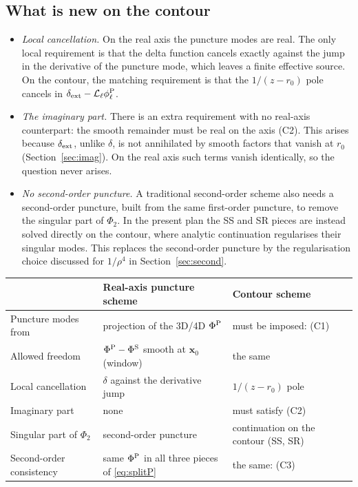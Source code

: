 \documentclass[11pt,a4paper]{article}
\newcommand{\dext}{\delta_{\rm ext}}
\newcommand{\Lop}{\mathcal{L}_\ell}
\newcommand{\PhiS}{\Phi^{\rm S}}
\newcommand{\x}{\mathbf{x}}
\begin{document}
\subsection{What is new on the contour}
\begin{itemize}[nosep]
\item \emph{Local cancellation.}
  On the real axis the puncture modes are real.
  The only local requirement is that the delta function cancels exactly against the jump in the derivative of the puncture mode, which leaves a finite effective source.
  On the contour, the matching requirement is that the $1/(z-r_0)$ pole cancels in $\dext-\Lop\phi^{\rm P}_\ell$.
\item \emph{The imaginary part.}
  There is an extra requirement with no real-axis counterpart: the smooth remainder must be real on the axis (C2).
  This arises because $\dext$, unlike $\delta$, is not annihilated by smooth factors that vanish at $r_0$ (Section~\ref{sec:imag}).
  On the real axis such terms vanish identically, so the question never arises.
\item \emph{No second-order puncture.}
  A traditional second-order scheme also needs a second-order puncture, built from the same first-order puncture, to remove the singular part of $\Phi_2$.
  In the present plan the SS and SR pieces are instead solved directly on the contour, where analytic continuation regularises their singular modes.
  This replaces the second-order puncture by the regularisation choice discussed for $1/\rho^4$ in Section~\ref{sec:second}.
\end{itemize}

{\small
\renewcommand{\arraystretch}{1.2}
\begin{center}
\begin{tabular}{@{}>{\raggedright}p{3.6cm}>{\raggedright}p{5.2cm}>{\raggedright\arraybackslash}p{5.5cm}@{}}
\toprule
& Real-axis puncture scheme & Contour scheme\\
\midrule
Puncture modes from & projection of the 3D/4D $\Phi^{\rm P}$ & must be imposed: (C1)\\
Allowed freedom & $\Phi^{\rm P}-\PhiS$ smooth at $\x_0$ (window) & the same\\
Local cancellation & $\delta$ against the derivative jump & $1/(z-r_0)$ pole\\
Imaginary part & none & must satisfy (C2)\\
Singular part of $\Phi_2$ & second-order puncture & continuation on the contour (SS, SR)\\
Second-order consistency & same $\Phi^{\rm P}$ in all three pieces of \eqref{eq:splitP} & the same: (C3)\\
\bottomrule
\end{tabular}
\end{center}
}
\end{document}
